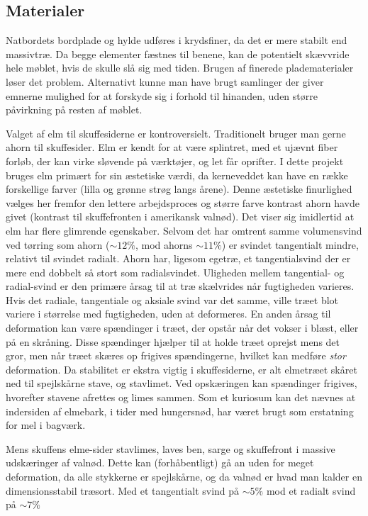 \subsection*{Materialer}
Natbordets bordplade og hylde udføres i krydsfiner, da det er mere stabilt
end massivtræ. Da begge elementer fæstnes til benene, kan de potentielt
skævvride hele møblet, hvis de skulle slå sig med tiden. Brugen af finerede
pladematerialer løser det problem. Alternativt kunne man have brugt samlinger
der giver emnerne mulighed for at forskyde sig i forhold til hinanden, uden
større påvirkning på resten af møblet.

Valget af elm til skuffesiderne er kontroversielt. Traditionelt bruger man gerne
ahorn til skuffesider. Elm er kendt for at være splintret, med et ujævnt fiber
forløb, der kan virke sløvende på værktøjer, og let får oprifter\footnotemark. I
dette projekt bruges elm primært for sin æstetiske værdi, da kerneveddet kan
have en række forskellige farver (lilla og grønne strøg langs årene). Denne
æstetiske finurlighed vælges her fremfor den lettere arbejdsproces og større
farve kontrast ahorn havde givet (kontrast til skuffefronten i amerikansk
valnød). Det viser sig imidlertid at elm har flere glimrende egenskaber. Selvom
det har omtrent samme volumensvind ved tørring som ahorn ($\sim12\%$, mod ahorns
$\sim11\%$) er svindet tangentialt mindre, relativt til svindet radialt. Ahorn
har, ligesom egetræ, et tangentialsvind der er mere end dobbelt så stort som
radialsvindet. Uligheden mellem tangential- og radial-svind er den primære årsag
til at træ skælvrides når fugtigheden varieres. Hvis det radiale, tangentiale og
aksiale svind var det samme, ville træet blot variere i størrelse med
fugtigheden, uden at deformeres. En anden årsag til deformation kan være spændinger i træet, der
opstår når det vokser i blæst, eller på en skråning. Disse spændinger hjælper
til  at holde træet oprejst mens det gror, men når træet skæres op frigives
spændingerne, hvilket kan medføre \textit{stor} deformation.
Da stabilitet er ekstra vigtig i
skuffesiderne, er alt elmetræet skåret ned til spejlskårne stave, og
stavlimet. Ved opskæringen kan spændinger frigives, hvorefter stavene afrettes
og limes sammen. Som et kuriosum kan
det nævnes at indersiden af elmebark, i tider med hungersnød, har været brugt
som erstatning for mel i bagværk.

Mens skuffens elme-sider stavlimes, laves ben, sarge og skuffefront i massive
udskæringer af valnød. Dette kan (forhåbentligt) gå an uden for meget
deformation, da alle stykkerne er spejlskårne, og da valnød er hvad man kalder
en dimensionsstabil træsort. Med et tangentialt svind på $\sim 5\%$ mod et
radialt svind på $\sim7\%$

